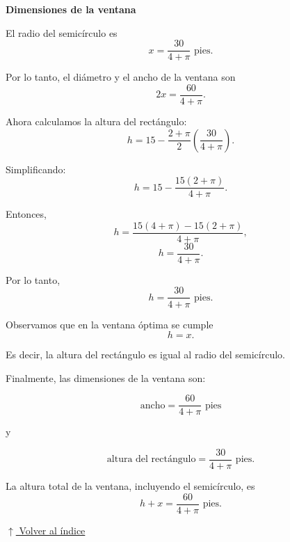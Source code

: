 \documentclass[12pt]{article}
\newcommand{\volverindice}{%
    \vspace{1em}%
    \begin{flushright}%
        \hyperlink{indice}{\small $\uparrow$ Volver al índice}%
    \end{flushright}%
}
\begin{document}
\begin{enumerate}[label=\alph*.-]
    \textbf{Dimensiones de la ventana}

    El radio del semicírculo es
    \[
    \boxed{
    x=\frac{30}{4+\pi}\text{ pies}
    }.
    \]

    Por lo tanto, el diámetro y el ancho de la ventana son
    \[
    2x=\frac{60}{4+\pi}.
    \]

    Ahora calculamos la altura del rectángulo:
    \[
    h
    =
    15-\frac{2+\pi}{2}
    \left(\frac{30}{4+\pi}\right).
    \]

    Simplificando:
    \[
    h
    =
    15-\frac{15(2+\pi)}{4+\pi}.
    \]

    Entonces,
    \[
    h
    =
    \frac{15(4+\pi)-15(2+\pi)}{4+\pi},
    \]
    \[
    h
    =
    \frac{30}{4+\pi}.
    \]

    Por lo tanto,
    \[
    \boxed{
    h=\frac{30}{4+\pi}\text{ pies}
    }.
    \]

    Observamos que en la ventana óptima se cumple
    \[
    \boxed{h=x}.
    \]

    Es decir, la altura del rectángulo es igual al radio del
    semicírculo.

    Finalmente, las dimensiones de la ventana son:

    \[
    \boxed{
    \text{ancho}=\frac{60}{4+\pi}\text{ pies}
    }
    \]

    y

    \[
    \boxed{
    \text{altura del rectángulo}=
    \frac{30}{4+\pi}\text{ pies}.
    }
    \]

    La altura total de la ventana, incluyendo el semicírculo, es
    \[
    h+x
    =
    \frac{60}{4+\pi}\text{ pies}.
    \]

\end{enumerate}

\volverindice
\newpage
\end{document}
